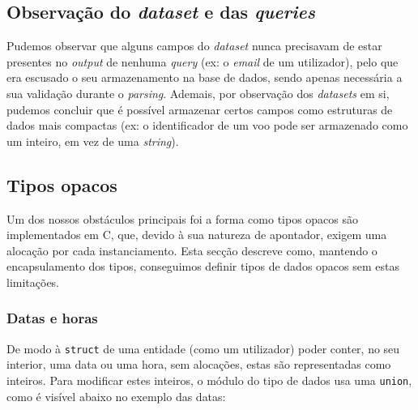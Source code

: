 \documentclass[12pt, a4paper]{article}
\begin{document}
\subsection{Observação do \emph{dataset} e das \emph{queries}}

Pudemos observar que alguns campos do \emph{dataset} nunca precisavam de estar presentes no
\emph{output} de nenhuma \emph{query} (ex: o \emph{email} de um utilizador), pelo que era escusado
o seu armazenamento na base de dados, sendo apenas necessária a sua validação durante o
\emph{parsing}. Ademais, por observação dos \emph{datasets} em si, pudemos concluir que é possível
armazenar certos campos como estruturas de dados mais compactas (ex: o identificador de um voo
pode ser armazenado como um inteiro, em vez de uma \emph{string}).

\subsection{Tipos opacos}

Um dos nossos obstáculos principais foi a forma como tipos opacos são implementados em C, que,
devido à sua natureza de apontador, exigem uma alocação por cada instanciamento. Esta secção
descreve como, mantendo o encapsulamento dos tipos, conseguimos definir tipos de dados opacos sem
estas limitações.

\subsubsection{Datas e horas}

De modo à \texttt{struct} de uma entidade (como um utilizador) poder conter, no seu interior, uma
data ou uma hora, sem alocações, estas são representadas como inteiros. Para modificar estes
inteiros, o módulo do tipo de dados usa uma \texttt{union}, como é visível abaixo no exemplo das
datas:
\end{document}
